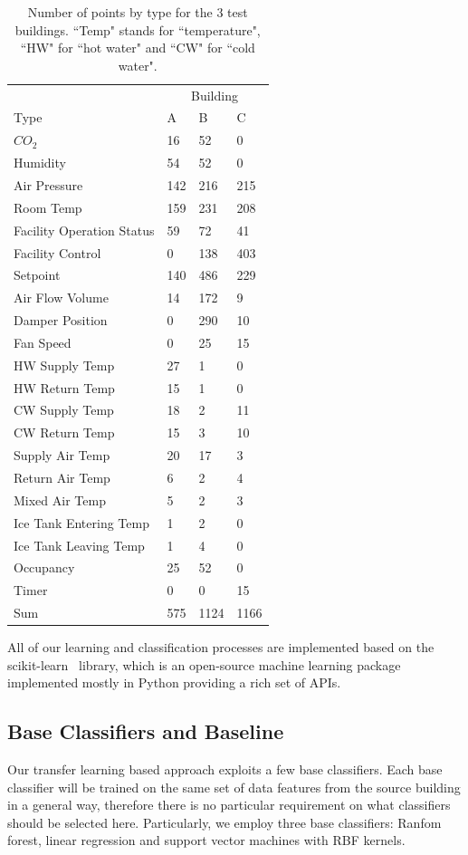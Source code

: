 \begin{table}[t]
\centering
\begin{tabular}{l | l l l}
\hline
& \multicolumn{3}{c}{Building} \\
Type & A & B & C\\
\hline\hline
$CO_{2}$ & 16 & 52 & 0\\
Humidity & 54 & 52 & 0\\
Air Pressure & 142 & 216 & 215\\
Room Temp & 159 & 231 & 208\\
Facility Operation Status & 59 & 72 & 41\\
Facility Control & 0 & 138 & 403\\
Setpoint & 140 & 486 & 229\\
Air Flow Volume & 14 & 172 & 9\\
Damper Position & 0 & 290 & 10\\
Fan Speed & 0 & 25 & 15\\
HW Supply Temp & 27 & 1 & 0\\
HW Return Temp & 15 & 1 & 0\\
CW Supply Temp & 18 & 2 & 11\\
CW Return Temp & 15 & 3 & 10\\
Supply Air Temp & 20 & 17 & 3\\
Return Air Temp & 6 & 2 & 4\\
Mixed Air Temp & 5 & 2 & 3\\
Ice Tank Entering Temp & 1 & 2 & 0\\
Ice Tank Leaving Temp & 1 & 4 & 0\\
Occupancy & 25 & 52 & 0\\
Timer & 0 & 0 & 15\\ \hline
Sum & 575 & 1124 & 1166\\ \hline
\end{tabular}
\caption{Number of points by type for the 3 test buildings. ``Temp" stands for ``temperature", ``HW" for ``hot water" and ``CW" for ``cold water".}
\label{table:num}
\end{table}


All of our learning and classification processes are implemented based on the scikit-learn~\cite{scikit} library, which is an open-source machine learning package 
implemented mostly in Python providing a rich set of APIs.

\subsection{Base Classifiers and Baseline}
\label{sec:baseline}
Our transfer learning based approach exploits a few base classifiers. Each base classifier will be trained on the same set of data features from the source building in a general way, therefore there is no particular requirement on what classifiers should be selected here.
Particularly, we employ three base classifiers: Ranfom forest, linear regression and support vector machines with RBF kernels.


